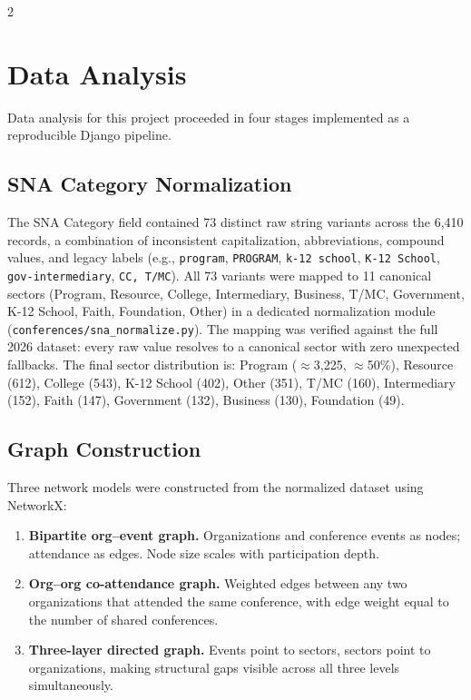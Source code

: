 \documentclass[11pt,letterpaper]{article}
\begin{document}
\begin{multicols}{2}
\section{Data Analysis}

Data analysis for this project proceeded in four stages implemented as a
reproducible Django pipeline.

\subsection{SNA Category Normalization}

The SNA Category field contained 73 distinct raw string variants across the
6,410 records, a combination of inconsistent capitalization, abbreviations,
compound values, and legacy labels (e.g., \texttt{program}, \texttt{PROGRAM},
\texttt{k-12 school}, \texttt{K-12 School}, \texttt{gov-intermediary},
\texttt{CC, T/MC}). All 73 variants were mapped to 11 canonical sectors
(Program, Resource, College, Intermediary, Business, T/MC, Government, K-12
School, Faith, Foundation, Other) in a dedicated normalization module
(\texttt{conferences/sna\_normalize.py}). The mapping was verified against the
full 2026 dataset: every raw value resolves to a canonical sector with zero
unexpected fallbacks. The final sector distribution is: Program
(${\approx}$3,225, ${\approx}$50\%), Resource (612), College (543), K-12 School
(402), Other (351), T/MC (160), Intermediary (152), Faith (147), Government
(132), Business (130), Foundation (49).

\subsection{Graph Construction}

Three network models were constructed from the normalized dataset using
NetworkX:
\begin{enumerate}[leftmargin=*, noitemsep]
  \item \textbf{Bipartite org--event graph.} Organizations and conference events
        as nodes; attendance as edges. Node size scales with participation depth.
  \item \textbf{Org--org co-attendance graph.} Weighted edges between any two
        organizations that attended the same conference, with edge weight equal
        to the number of shared conferences.
  \item \textbf{Three-layer directed graph.} Events point to sectors, sectors
        point to organizations, making structural gaps visible across all three
        levels simultaneously.
\end{enumerate}


\end{multicols}
\end{document}
